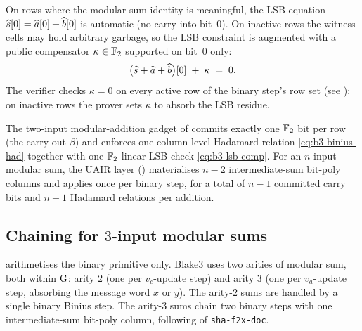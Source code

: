 \begin{remark}\label{rem:b3-bin-lsb-comp}
On rows where the modular-sum identity is meaningful, the LSB
equation $\widehat{s}[0] = \widehat{a}[0] + \widehat{b}[0]$ is automatic (no carry
into bit~$0$). On inactive rows the witness cells may hold arbitrary
garbage, so the LSB constraint is augmented with a public compensator
$\kappa \in \mathbb{F}_2$ supported on bit~$0$ only:
\begin{equation}\label{eq:b3-lsb-comp}
\bigl(\widehat{s} + \widehat{a} + \widehat{b}\bigr)[0] \;+\; \kappa \;=\; 0.
\end{equation}
The verifier checks $\kappa = 0$ on every active row of the binary
step's row set (see ); on inactive rows
the prover sets $\kappa$ to absorb the LSB residue.
\end{remark}

\begin{proposition}\label{prop:b3-binius-count}
The two-input modular-addition gadget of 
commits exactly one $\mathbb{F}_2$ bit per row (the carry-out $\beta$) and
enforces one column-level Hadamard relation \eqref{eq:b3-binius-had}
together with one $\mathbb{F}_2$-linear LSB check \eqref{eq:b3-lsb-comp}. For
an $n$-input modular sum, the UAIR layer ()
materialises $n - 2$ intermediate-sum bit-poly columns and applies
 once per binary step, for a total of $n - 1$
committed carry bits and $n - 1$ Hadamard relations per addition.
\end{proposition}

\subsection{Chaining for $3$-input modular sums}\label{sec:b3-mod-add-chain}

 arithmetises the binary primitive only. Blake3
uses two arities of modular sum, both within $\operatorname{G}$: arity $2$ (one
per $v_c$-update step) and arity $3$ (one per $v_a$-update step,
absorbing the message word $x$ or $y$). The arity-$2$ sums are handled
by a single binary Binius step. The arity-$3$ sums chain two binary
steps with one intermediate-sum bit-poly column, following
 of \texttt{sha-f2x-doc}.

